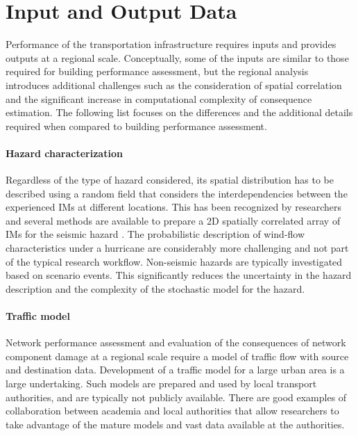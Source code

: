 \section{Input and Output Data}
\label{sec:perf_transport_io}

Performance of the transportation infrastructure requires inputs and provides outputs at a regional scale. Conceptually, some of the inputs are similar to those required for building performance assessment, but the regional analysis introduces additional challenges such as the consideration of spatial correlation and the significant increase in computational complexity of consequence estimation. The following list focuses on the differences and the additional details required when compared to building performance assessment.

\paragraph{Hazard characterization} Regardless of the type of hazard considered, its spatial distribution has to be described using a random field that considers the interdependencies between the experienced IMs at different locations. This has been recognized by researchers and several methods are available to prepare a 2D spatially correlated array of IMs for the seismic hazard \citep[e.g.,][]{lee2006uncertainty, han2012probabilistic, loth2013spatial}. The probabilistic description of wind-flow characteristics under a hurricane are considerably more challenging and not part of the typical research workflow. Non-seismic hazards are typically investigated based on scenario events. This significantly reduces the uncertainty in the hazard description and the complexity of the stochastic model for the hazard.

\paragraph{Traffic model} Network performance assessment and evaluation of the consequences of network component damage at a regional scale require a model of traffic flow with source and destination data. Development of a traffic model for a large urban area is a large undertaking. Such models are prepared and used by local transport authorities, and are typically not publicly available. There are good examples of collaboration between academia and local authorities that allow researchers to take advantage of the mature models and vast data available at the authorities.

